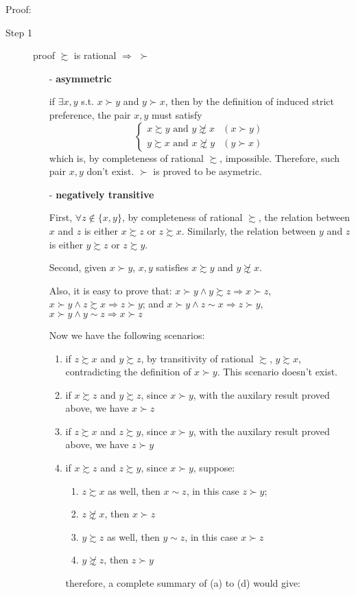 Proof:
\begin{description}
    \item[Step 1] proof $\succsim$ is rational $\Rightarrow$ $\succ$ 
    \begin{itemize}
        \item[-] \textbf{asymmetric}
        
        if $\exists x,y$ s.t. $x\succ y$ and $y\succ x$, then by the definition of induced strict preference, the pair $x,y$ must satisfy 
        $$\begin{cases}
        x\succsim y\text{ and }y\not\succsim x & (x\succ y)\\
        y\succsim x\text{ and }x\not\succsim y & (y\succ x)
        \end{cases}$$
        which is, by completeness of rational $\succsim$, impossible. Therefore, such pair $x,y$ don't exist. $\succ$ is proved to be asymetric.
        
        \item[-] \textbf{negatively transitive}
        
        First, $\forall z\notin\{x,y\}$, by completeness of rational $\succsim$, the relation between $x$ and $z$ is either $x\succsim z$ or $z\succsim x$.
        Similarly, the relation between $y$ and $z$ is either $y\succsim z$ or $z\succsim y$.
        
        Second, given $x\succ y$, $x,y$ satisfies $x\succsim y$ and $y\not\succsim x$.
        
        Also, it is easy to prove that: $x\succ y \land y\succsim z \Rightarrow x\succ z$, $x\succ y \land z\succsim x\Rightarrow z\succ y$; and $x\succ y\land z\sim x\Rightarrow z\succ y$, $x\succ y\land y\sim z\Rightarrow x\succ z$

        Now we have the following scenarios:
        \begin{enumerate}
        \item if $z\succsim x$ and $y\succsim z$, by transitivity of rational
        $\succsim$, $y\succsim x$, contradicting the definition of $x\succ y$.
        This scenario doesn't exist.
        \item if $x\succsim z$ and $y\succsim z$, since $x\succ y$, with the
        auxilary result proved above, we have $x\succ z$
        \item if $z\succsim x$ and $z\succsim y$, since $x\succ y$, with the
        auxilary result proved above, we have $z\succ y$
        \item if $x\succsim z$ and $z\succsim y$, since $x\succ y$, suppose:
        \begin{enumerate}
        \item $z\succsim x$ as well, then $x\sim z$, in this case $z\succ y$;
        \item $z\not\succsim x$, then $x\succ z$
        \item $y\succsim z$ as well, then $y\sim z$, in this case $x\succ z$
        \item $y\not\succsim z$, then $z\succ y$
        \end{enumerate}
        therefore, a complete summary of (a) to (d) would give:
        

\end{enumerate}
\end{itemize}
\end{description}
